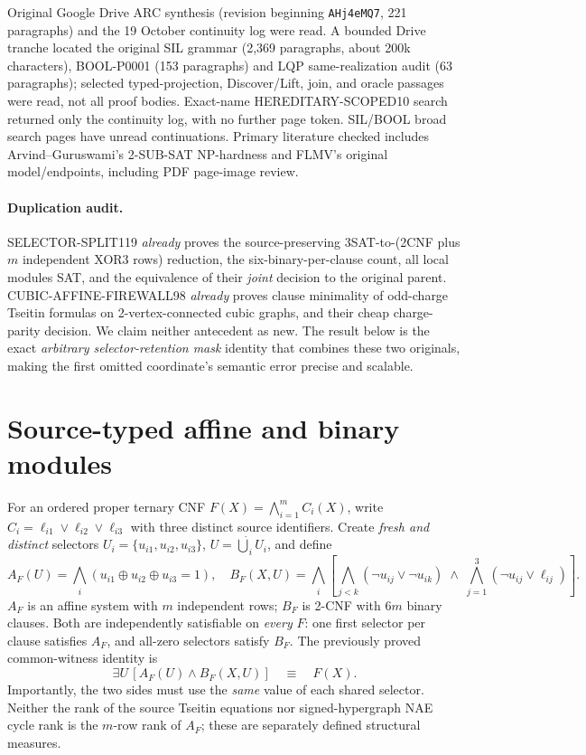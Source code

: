 \documentclass[11pt]{article}
\begin{document}
Original Google Drive ARC synthesis (revision beginning \texttt{AHj4eMQ7}, 221 paragraphs) and the 19 October continuity log were read. A bounded Drive tranche located the original SIL grammar (2,369 paragraphs, about 200k characters), BOOL-P0001 (153 paragraphs) and LQP same-realization audit (63 paragraphs); selected typed-projection, Discover/Lift, join, and oracle passages were read, not all proof bodies. Exact-name HEREDITARY-SCOPED10 search returned only the continuity log, with no further page token. SIL/BOOL broad search pages have unread continuations. Primary literature checked includes Arvind--Guruswami's 2-SUB-SAT NP-hardness and FLMV's original model/endpoints, including PDF page-image review.

\paragraph{Duplication audit.}
SELECTOR-SPLIT119 \emph{already} proves the source-preserving 3SAT-to-(2CNF plus $m$ independent XOR3 rows) reduction, the six-binary-per-clause count, all local modules SAT, and the equivalence of their \emph{joint} decision to the original parent. CUBIC-AFFINE-FIREWALL98 \emph{already} proves clause minimality of odd-charge Tseitin formulas on 2-vertex-connected cubic graphs, and their cheap charge-parity decision. We claim neither antecedent as new. The result below is the exact \emph{arbitrary selector-retention mask} identity that combines these two originals, making the first omitted coordinate's semantic error precise and scalable.

\section{Source-typed affine and binary modules}
For an ordered proper ternary CNF $F(X)=\bigwedge_{i=1}^{m}C_i(X)$, write
$C_i=\ell_{i1}\vee\ell_{i2}\vee\ell_{i3}$ with three distinct source identifiers.
Create \emph{fresh and distinct} selectors
$U_i=\{u_{i1},u_{i2},u_{i3}\}$, $U=\dot\bigcup_iU_i$, and define
\[
 A_F(U)=\bigwedge_i(u_{i1}\oplus u_{i2}\oplus u_{i3}=1),
 \quad
 B_F(X,U)=\bigwedge_i\left[
 \bigwedge_{j<k}(\neg u_{ij}\vee\neg u_{ik})
 \;\wedge\;\bigwedge_{j=1}^3(\neg u_{ij}\vee\ell_{ij})
 \right].
 \tag{1}
\]
$A_F$ is an affine system with $m$ independent rows; $B_F$ is 2-CNF with $6m$ binary clauses.
Both are independently satisfiable on \emph{every} $F$:
one first selector per clause satisfies $A_F$, and all-zero selectors satisfy $B_F$.
The previously proved common-witness identity is
\[
 \exists U\,[A_F(U)\wedge B_F(X,U)]\quad\equiv\quad F(X).
 \tag{2}
\]
Importantly, the two sides must use the \emph{same} value of each shared selector.
Neither the rank of the source Tseitin equations nor signed-hypergraph NAE cycle rank is the $m$-row rank of $A_F$; these are separately defined structural measures.
\end{document}
